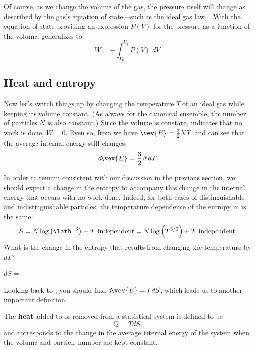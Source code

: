 Of course, as we change the volume of the gas, the pressure itself will change as described by the gas's equation of state---such as the ideal gas law, .
With the equation of state providing an expression $P(V)$ for the pressure as a function of the volume,  generalizes to
\begin{equation}
  \label{eq:work}
  W = -\int_{V_0}^{V_f} P(V) \; dV.
\end{equation}



\subsection{Heat and entropy}
Now let's switch things up by changing the temperature $T$ of an ideal gas while keeping its volume constant.
(As always for the canonical ensemble, the number of particles $N$ is also constant.)
Since the volume is constant,  indicates that no work is done, $W = 0$.
Even so, from  we have $\vev{E} = \frac{3}{2} NT$ and can see that the average internal energy still changes,
\begin{equation}
  \label{eq:dE_dT}
  d\!\vev{E} = \frac{3}{2} N dT.
\end{equation}

In order to remain consistent with our discussion in the previous section, we should expect a change in the entropy to accompany this change in the internal energy that occurs with no work done.
Indeed, for both cases of distinguishable and indistinguishable particles, the temperature dependence of the entropy in  is the same:
\begin{equation*}
  S = N\log\left(\lath^{-3}\right) + T\mbox{-independent} = N\log\left(T^{3 / 2}\right) + T\mbox{-independent}.
\end{equation*}
What is the change in the entropy that results from changing the temperature by $dT$?
\begin{mdframed}
  $\displaystyle dS = $ \\[60 pt]
\end{mdframed}
Looking back to , you should find $d\!\vev{E} = T dS$, which leads us to another important definition.

\begin{shaded}
  The \textbf{heat} added to or removed from a statistical system is defined to be
  \begin{equation}
    \label{eq:heat_def}
    Q = T dS,
  \end{equation}
  and corresponds to the change in the average internal energy of the system when the volume and particle number are kept constant.
\end{shaded}

